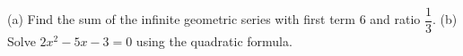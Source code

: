 (a) Find the sum of the infinite geometric series with first term $6$ and ratio $\dfrac{1}{3}$. (b) Solve $2x^2-5x-3=0$ using the quadratic formula.
